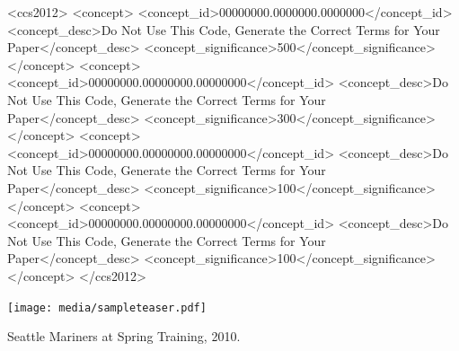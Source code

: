 \documentclass[sigconf]{acmart}
\begin{document}
	\begin{abstract}
		A clear and well-documented \LaTeX\ document is presented as an
		article formatted for publication by ACM in a conference proceedings
		or journal publication. Based on the ``acmart'' document class, this
		article presents and explains many of the common variations, as well
		as many of the formatting elements an author may use in the
		preparation of the documentation of their work.
	\end{abstract}
	
	\begin{CCSXML}
		<ccs2012>
		<concept>
		<concept_id>00000000.0000000.0000000</concept_id>
		<concept_desc>Do Not Use This Code, Generate the Correct Terms for Your Paper</concept_desc>
		<concept_significance>500</concept_significance>
		</concept>
		<concept>
		<concept_id>00000000.00000000.00000000</concept_id>
		<concept_desc>Do Not Use This Code, Generate the Correct Terms for Your Paper</concept_desc>
		<concept_significance>300</concept_significance>
		</concept>
		<concept>
		<concept_id>00000000.00000000.00000000</concept_id>
		<concept_desc>Do Not Use This Code, Generate the Correct Terms for Your Paper</concept_desc>
		<concept_significance>100</concept_significance>
		</concept>
		<concept>
		<concept_id>00000000.00000000.00000000</concept_id>
		<concept_desc>Do Not Use This Code, Generate the Correct Terms for Your Paper</concept_desc>
		<concept_significance>100</concept_significance>
		</concept>
		</ccs2012>
	\end{CCSXML}
	
	
	
	\begin{teaserfigure}
		\texttt{[image: media/sampleteaser.pdf]}
		\caption{Seattle Mariners at Spring Training, 2010.}
		\label{fig:teaser}
	\end{teaserfigure}
	
\end{document}
